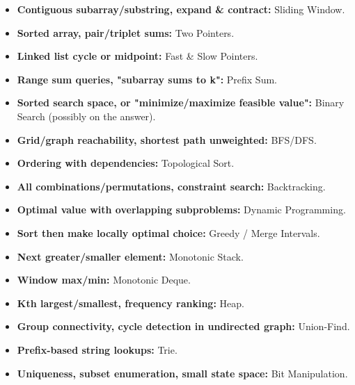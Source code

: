 \documentclass[11pt]{article}
\begin{document}
\begin{itemize}[leftmargin=1.5em]
    \item \textbf{Contiguous subarray/substring, expand \& contract:}
        Sliding Window.
    \item \textbf{Sorted array, pair/triplet sums:} Two Pointers.
    \item \textbf{Linked list cycle or midpoint:} Fast \& Slow Pointers.
    \item \textbf{Range sum queries, "subarray sums to k":} Prefix Sum.
    \item \textbf{Sorted search space, or "minimize/maximize feasible
        value":} Binary Search (possibly on the answer).
    \item \textbf{Grid/graph reachability, shortest path unweighted:}
        BFS/DFS.
    \item \textbf{Ordering with dependencies:} Topological Sort.
    \item \textbf{All combinations/permutations, constraint search:}
        Backtracking.
    \item \textbf{Optimal value with overlapping subproblems:} Dynamic
        Programming.
    \item \textbf{Sort then make locally optimal choice:} Greedy /
        Merge Intervals.
    \item \textbf{Next greater/smaller element:} Monotonic Stack.
    \item \textbf{Window max/min:} Monotonic Deque.
    \item \textbf{Kth largest/smallest, frequency ranking:} Heap.
    \item \textbf{Group connectivity, cycle detection in undirected
        graph:} Union-Find.
    \item \textbf{Prefix-based string lookups:} Trie.
    \item \textbf{Uniqueness, subset enumeration, small state space:}
        Bit Manipulation.
\end{itemize}
\end{document}
